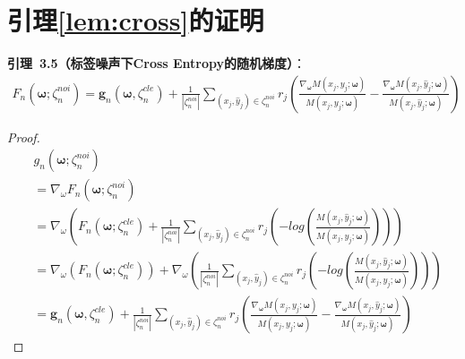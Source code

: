 \section{引理\ref{lem:cross}的证明}\label{app:lemma5}
\noindent \textbf{引理~3.5（标签噪声下Cross Entropy的随机梯度）}：
\begin{multline}\label{eq:lamma5}
F_n\left(\boldsymbol{\omega};\zeta_n^{noi}\right)=\boldsymbol{g}_n\left(\boldsymbol{\omega},\zeta_n^{cle}\right)+\frac{1}{|\zeta_n^{noi}|}\sum_{\left(x_j,\hat{y}_j\right)\in \zeta_n^{noi}}r_j\left(\frac{\nabla_{\boldsymbol{\omega}} M\left(x_j, y_j; \boldsymbol{\omega}\right)}{M\left(x_j, y_j; \boldsymbol{\omega}\right)} -\frac{\nabla_{\boldsymbol{\omega}} M\left(x_j, \hat{y}_j; \boldsymbol{\omega}\right)}{M\left(x_j, \hat{y}_j; \boldsymbol{\omega}\right)}\right)
\end{multline}

\begin{proof}
\begin{equation}
    \begin{aligned}
&g_n\left(\boldsymbol{\omega};\zeta_n^{noi}\right)\\
&=\nabla_\omega F_n\left(\boldsymbol{\omega};\zeta_n^{noi}\right)\\
&=\nabla_\omega\left(F_n\left(\boldsymbol{\omega};\zeta_n^{cle}\right)+\frac{1}{|\zeta_n^{noi}|}\sum_{\left(x_j,\hat{y}_j\right)\in \zeta_n^{noi}}r_j\left(-log\left(\frac{M\left(x_j, \hat{y}_j; \boldsymbol{\omega}\right)}{M\left(x_j, y_j; \boldsymbol{\omega}\right)}\right)\right)\right)\\
&=\nabla_\omega\left(F_n\left(\boldsymbol{\omega};\zeta_n^{cle}\right)\right)+\nabla_\omega\left(\frac{1}{|\zeta_n^{noi}|}\sum_{\left(x_j,\hat{y}_j\right)\in \zeta_n^{noi}}r_j\left(-log\left(\frac{M\left(x_j, \hat{y}_j; \boldsymbol{\omega}\right)}{M\left(x_j, y_j; \boldsymbol{\omega}\right)}\right)\right)\right)\\
&=\boldsymbol{g}_n\left(\boldsymbol{\omega},\zeta_n^{cle}\right)+\frac{1}{|\zeta_n^{noi}|}\sum_{\left(x_j,\hat{y}_j\right)\in \zeta_n^{noi}}r_j\left(\frac{\nabla_{\boldsymbol{\omega}} M\left(x_j, y_j; \boldsymbol{\omega}\right)}{M\left(x_j, y_j; \boldsymbol{\omega}\right)} -\frac{\nabla_{\boldsymbol{\omega}} M\left(x_j, \hat{y}_j; \boldsymbol{\omega}\right)}{M\left(x_j, \hat{y}_j; \boldsymbol{\omega}\right)}\right)
    \end{aligned}
\end{equation}
\end{proof}


